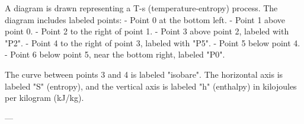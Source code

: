 A diagram is drawn representing a T-s (temperature-entropy) process. The diagram includes labeled points:  
- Point 0 at the bottom left.  
- Point 1 above point 0.  
- Point 2 to the right of point 1.  
- Point 3 above point 2, labeled with "P2".  
- Point 4 to the right of point 3, labeled with "P5".  
- Point 5 below point 4.  
- Point 6 below point 5, near the bottom right, labeled "P0".  

The curve between points 3 and 4 is labeled "isobare".  
The horizontal axis is labeled "S" (entropy), and the vertical axis is labeled "h" (enthalpy) in kilojoules per kilogram (kJ/kg).  

---